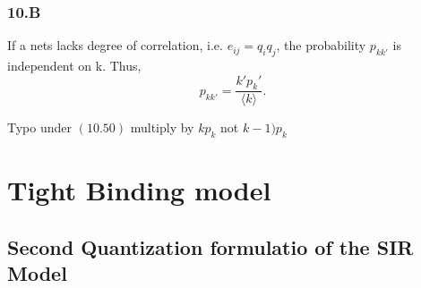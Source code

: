 \documentclass[a4paper,11pt,twoside]{report} %
\begin{document}
\subsection{10.B}

If a nets lacks degree of correlation, i.e. $e_{ij}=q_iq_j$, the probability $p_{kk'}$ is independent on k. Thus, $$p_{kk'}=\frac{k'p_k'}{\langle k\rangle}.$$

Typo under $(10.50)$ multiply by $kp_k$ not $k-1)p_k$





\clearpage


\chapter{Tight Binding model}


\section{Second Quantization formulatio of the SIR Model}





\end{document}
